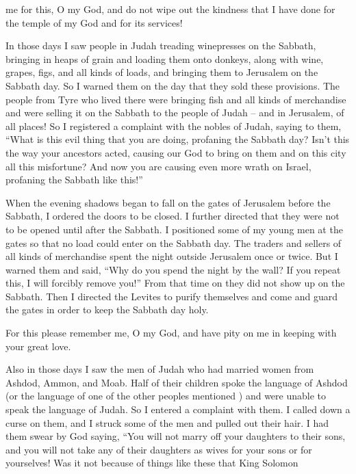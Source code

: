 {me for this,
O my God,
and do not
wipe out
the kindness
that
I have done
for the temple
of my God
and for its services!
\par }{\PP {}In those
days
I saw
people in Judah
treading
winepresses
on the Sabbath,
bringing
in heaps of grain
and loading
them onto
donkeys,
along with
wine,
grapes,
figs,
and all
kinds of loads,
and bringing
them to Jerusalem
on the Sabbath
day.
So I warned
them on the day
that they sold
these provisions.
The people from Tyre
who lived
there were bringing
fish
and all
kinds of merchandise
and were selling
it on the Sabbath
to the people of Judah
– and in Jerusalem, of all places!
So
I registered
a complaint with
the nobles
of Judah,
saying
to them, “What
is this
evil
thing
that
you
are doing,
profaning
the Sabbath
day?
Isn’t
this
the way your ancestors
acted,
causing
our God
to bring
on
them and on
this city
all
this misfortune? And now you
are causing
even more wrath
on
Israel,
profaning
the Sabbath like this!”
\par }{\PP {}When
the evening shadows
began to fall on the gates
of Jerusalem
before
the Sabbath,
I ordered
the doors
to be closed.
I further directed
that
they were not
to be opened
until
after
the Sabbath.
I positioned
some of my young men
at
the gates
so that no
load
could enter
on the Sabbath
day.
The traders
and sellers
of all
kinds of merchandise
spent
the night outside
Jerusalem
once or twice.
But I warned
them and said, “Why
do you
spend
the night by
the wall? If
you repeat
this, I will forcibly remove
you!” From
that time
on they did not
show up
on the Sabbath.
Then I directed the Levites
to purify
themselves and come
and guard
the gates
in order to keep the Sabbath
day
holy.
\par }{\PP For this
please remember
me, O my God,
and have pity
on
me in keeping with your great
love.
\par }{\PP {}Also
in those
days
I saw
the men of Judah
who had married women
from Ashdod,
Ammon, and Moab.
Half
of their children
spoke
the language
of Ashdod
(or the language
of one of the other peoples mentioned
) and were unable
to speak
the language
of Judah.
So
I entered a complaint
with
them. I called down a curse
on them, and I struck
some
of the men
and pulled
out their hair. I had them swear
by God
saying, “You will not marry off
your daughters
to their sons,
and you will
not
take
any of their daughters
as wives for your sons
or for yourselves!
Was it not
because
of things like these
that King
Solomon
}
